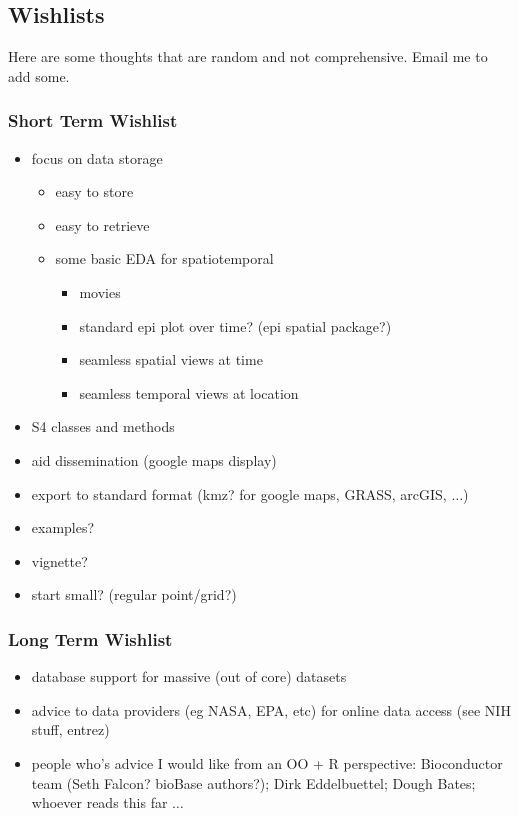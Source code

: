 \documentclass[12pt]{article}
\begin{document}
\subsection*{Wishlists}
Here are some thoughts that are random and not comprehensive.  Email
me to add some.

\subsubsection*{Short Term Wishlist}
\begin{itemize}
\item focus on data storage
\begin{itemize}
\item easy to store
\item easy to retrieve
\item some basic EDA for spatiotemporal
\begin{itemize}
\item movies
\item standard epi plot over time? (epi spatial package?)
\item seamless spatial views at time
\item seamless temporal views at location
\end{itemize}
\end{itemize}
\item S4 classes and methods
\item aid dissemination (google maps display)
\item export to standard format (kmz? for google maps, GRASS, arcGIS, $\ldots$)
\item examples?
\item vignette?
\item start small? (regular point/grid?)
\end{itemize}


\subsubsection*{Long Term Wishlist}
\begin{itemize}
\item database support for massive (out of core) datasets
\item advice to data providers (eg NASA, EPA, etc) for online data access (see NIH stuff, entrez)
\item people who's advice I would like from an OO + R perspective: Bioconductor team (Seth Falcon?
bioBase authors?); Dirk Eddelbuettel; Dough Bates; whoever reads this far $\ldots$
\end{itemize}
\end{document}
